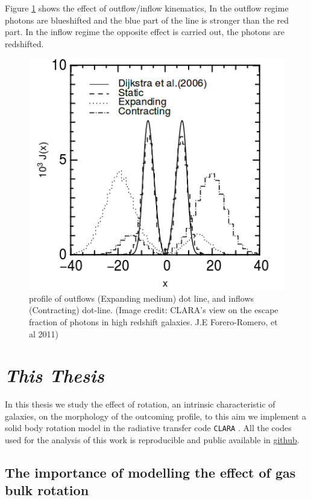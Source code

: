 Figure \ref{fig:out} shows the effect of outflow/inflow kinematics, 
In the outflow regime photons are blueshifted and the blue part of the line
is stronger than the red part. In the inflow regime the opposite effect
is carried out, the \ly photons are redshifted. 

\begin{figure}[H]%
\begin{center}
\includegraphics[scale=0.4]{Figures/out.png}
\end{center}\caption{\ly profile of outflows (Expanding medium) dot line, 
and inflows (Contracting) dot-line. (Image credit: CLARA's view on the escape fraction of \ly photons in high redshift galaxies. J.E Forero-Romero, et al 2011)\label{fig:out}
 }
\end{figure}

\section{\emph{This Thesis}}

In this thesis we study the effect of rotation, an intrinsic
 characteristic of galaxies, on the morphology
of the \lya outcoming profile, to this aim we implement a solid body
rotation model in the radiative transfer code \verb+CLARA+ \citep{CLARA}.
All the codes used for the analysis of this work is reproducible
and public available in \href{https://github.com/jngaravitoc/RotationLyAlpha}{github}.

\subsection{The importance of modelling the effect of gas bulk rotation}

